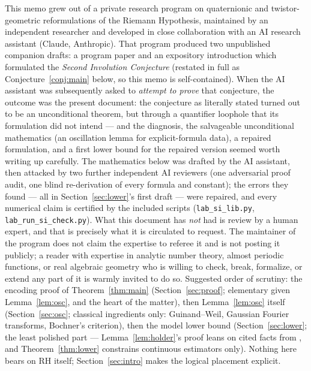 \documentclass[11pt]{amsart}
\theoremstyle{definition}
\theoremstyle{remark}
\begin{document}
This memo grew out of a private research program on quaternionic and twistor-geometric reformulations of the Riemann Hypothesis, maintained by an independent researcher and developed in close collaboration with an AI research assistant (Claude, Anthropic). That program produced two unpublished companion drafts: a program paper \cite{ZS} and an expository introduction \cite{SI} which formulated the \emph{Second Involution Conjecture} (restated in full as Conjecture~\ref{conj:main} below, so this memo is self-contained). When the AI assistant was subsequently asked to \emph{attempt to prove} that conjecture, the outcome was the present document: the conjecture as literally stated turned out to be an unconditional theorem, but through a quantifier loophole that its formulation did not intend --- and the diagnosis, the salvageable unconditional mathematics (an oscillation lemma for explicit-formula data), a repaired formulation, and a first lower bound for the repaired version seemed worth writing up carefully. The mathematics below was drafted by the AI assistant, then attacked by two further independent AI reviewers (one adversarial proof audit, one blind re-derivation of every formula and constant); the errors they found --- all in Section~\ref{sec:lower}'s first draft --- were repaired, and every numerical claim is certified by the included scripts (\texttt{lab\_si\_lib.py}, \texttt{lab\_run\_si\_check.py}). What this document has \emph{not} had is review by a human expert, and that is precisely what it is circulated to request. The maintainer of the program does not claim the expertise to referee it and is not posting it publicly; a reader with expertise in analytic number theory, almost periodic functions, or real algebraic geometry who is willing to check, break, formalize, or extend any part of it is warmly invited to do so. Suggested order of scrutiny: the encoding proof of Theorem~\ref{thm:main} (Section~\ref{sec:proof}; elementary given Lemma~\ref{lem:osc}, and the heart of the matter), then Lemma~\ref{lem:osc} itself (Section~\ref{sec:osc}; classical ingredients only: Guinand--Weil, Gaussian Fourier transforms, Bochner's criterion), then the model lower bound (Section~\ref{sec:lower}; the least polished part --- Lemma~\ref{lem:holder}'s proof leans on cited facts from \cite{BCR}, and Theorem~\ref{thm:lower} constrains continuous estimators only). Nothing here bears on RH itself; Section~\ref{sec:intro} makes the logical placement explicit.

\end{document}
